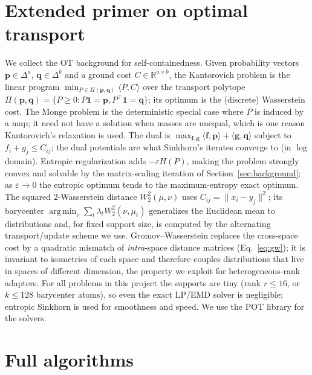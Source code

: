 \documentclass[11pt]{article}
\newcommand{\R}{\mathbb{R}}
\newcommand{\argmin}{\operatorname*{arg\,min}}
\begin{document}
\clearpage
\appendix

\section{Extended primer on optimal transport}
\label{app:otprimer}
We collect the OT background for self-containedness. Given probability vectors $\bm p\in\Delta^{a}$,
$\bm q\in\Delta^{b}$ and a ground cost $C\in\R^{a\times b}$, the Kantorovich problem is the linear
program $\min_{P\in\Pi(\bm p,\bm q)}\langle P,C\rangle$ over the transport polytope
$\Pi(\bm p,\bm q)=\{P\ge0: P\mathbf 1=\bm p, P^\top\mathbf 1=\bm q\}$; its optimum is the (discrete)
Wasserstein cost. The Monge problem is the deterministic special case where $P$ is induced by a map; it
need not have a solution when masses are unequal, which is one reason Kantorovich's relaxation is used.
The dual is $\max_{\bm f,\bm g}\langle\bm f,\bm p\rangle+\langle\bm g,\bm q\rangle$ subject to
$f_i+g_j\le C_{ij}$; the dual potentials are what Sinkhorn's iterates converge to (in $\log$ domain).
Entropic regularization adds $-\varepsilon H(P)$, making the problem strongly convex and solvable by the
matrix-scaling iteration of Section~\ref{sec:background}; as $\varepsilon\to0$ the entropic optimum tends
to the maximum-entropy exact optimum. The squared $2$-Wasserstein distance $W_2^2(\mu,\nu)$ uses
$C_{ij}=\|x_i-y_j\|^2$; its barycenter $\argmin_\nu\sum_t\lambda_t W_2^2(\nu,\mu_t)$
\citep{agueh2011barycenters} generalizes the Euclidean mean to distributions and, for fixed support size,
is computed by the alternating transport/update scheme we use. Gromov--Wasserstein
\citep{memoli2011gromov} replaces the cross-space cost by a quadratic mismatch of \emph{intra}-space
distance matrices (Eq.~\eqref{eq:gw}); it is invariant to isometries of each space and therefore couples
distributions that live in spaces of different dimension, the property we exploit for
heterogeneous-rank adapters. For all problems in this project the supports are tiny (rank $r\le16$, or
$k\le128$ barycenter atoms), so even the exact LP/EMD solver is negligible; entropic Sinkhorn is used for
smoothness and speed. We use the POT library \citep{flamary2021pot} for the solvers.

\section{Full algorithms}
\label{app:alg}
\end{document}
